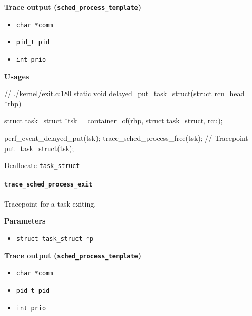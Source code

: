 \textbf{Trace output (\texttt{sched\_process\_template})}
\begin{itemize}
    \item \verb|char *comm|
    \item \verb|pid_t pid|
    \item \verb|int prio|
\end{itemize}

\textbf{Usages}
\begin{code}
// ./kernel/exit.c:180
static void delayed_put_task_struct(struct rcu_head *rhp){
	struct task_struct *tsk = container_of(rhp, struct task_struct, rcu);

	perf_event_delayed_put(tsk);
	trace_sched_process_free(tsk); // Tracepoint
	put_task_struct(tsk);
}
\end{code}
Deallocate \verb|task_struct|
  
\paragraph{\texttt{trace\_sched\_process\_exit}}
Tracepoint for a task exiting.

\textbf{Parameters}
\begin{itemize}
    \item \verb|struct task_struct *p|
\end{itemize}

\textbf{Trace output (\texttt{sched\_process\_template})}
\begin{itemize}
    \item \verb|char *comm|
    \item \verb|pid_t pid|
    \item \verb|int prio|
\end{itemize}

